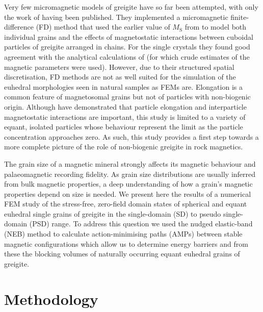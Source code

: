 \documentclass[review,authoryear]{elsarticle}
\begin{document}
Very few micromagnetic models of greigite have so far been attempted, with only the work of \citet{Muxworthy2013} having been published. They implemented a micromagnetic finite-difference (FD) method that used the earlier value of $M_\text{S}$ from \citet{Chang2009} to model both individual grains and the effects of magnetostatic interactions between cuboidal particles of greigite arranged in chains. For the single crystals they found good agreement with the analytical calculations of \citet{Diaz-Ricci1992} (for which crude estimates of the magnetic parameters were used). However, due to their structured spatial discretisation, FD methods are not as well suited for the simulation of the euhedral morphologies seen in natural samples \citep{Snowball1997} as FEMs are. Elongation is a common feature of magnetosomal grains but not of particles with non-biogenic origin. Although \citet{Muxworthy2013} have demonstrated that particle elongation and interparticle magnetostatic interactions are important, this study is limited to a variety of equant, isolated particles whose behaviour represent the limit as the particle concentration approaches zero. As such, this study provides a first step towards a more complete picture of the role of non-biogenic greigite in rock magnetics.\par

The grain size of a magnetic mineral strongly affects its magnetic behaviour and palaeomagnetic recording fidelity. As grain size distributions are usually inferred from bulk magnetic properties, a deep understanding of how a grain's magnetic properties depend on size is needed. We present here the results of a numerical FEM study of the stress-free, zero-field domain states of spherical and equant euhedral single grains of greigite in the single-domain (SD) to pseudo single-domain (PSD) range. To address this question we used the nudged elastic-band (NEB) method \citep{Fabian2017} to calculate action-minimising paths (AMPs) between stable magnetic configurations which allow us to determine energy barriers and from these the blocking volumes of naturally occurring equant euhedral grains of greigite.\par

\section{Methodology}
\end{document}
